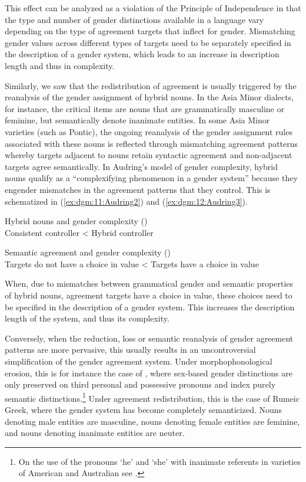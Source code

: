 \documentclass[output=collectionpaper]{langsci/langscibook}
\begin{document}
This effect can be analyzed as a violation of the Principle of Independence in that the type and number of gender distinctions available in a language vary depending on the type of agreement targets that inflect for gender.  Mismatching gender values across different types of targets need to be separately specified in the description of a gender system, which leads to an increase in description length and thus in complexity.

Similarly, we saw that the redistribution of agreement is usually triggered by the reanalysis of the gender assignment of hybrid nouns. In the Asia Minor  dialects, for instance, the critical items are nouns that are grammatically masculine or feminine, but semantically denote inanimate entities. In some Asia Minor  varieties (such as Pontic), the ongoing reanalysis of the gender assignment rules associated with these nouns is reflected through mismatching agreement patterns whereby targets adjacent to nouns retain syntactic agreement and non-adjacent targets agree semantically. In Audring's model of gender complexity, hybrid nouns qualify as a ``complexifying phenomenon in a gender system'' because they engender mismatches in the agreement patterns that they control. This is schematized in (\ref{ex:dgm:11:Audring2}) and (\ref{ex:dgm:12:Audring3}).

\ea\label{ex:dgm:11:Audring2}
Hybrid nouns and gender complexity (\citealt{Audring2017})\\

\vspace{3mm}
Consistent controller {\textless} Hybrid controller
\z

\ea\label{ex:dgm:12:Audring3}
Semantic agreement and gender complexity (\citealt{Audring2017})\\

\vspace{3mm}
Targets do not have a choice in value {\textless} Targets have a choice in value
\z

When, due to mismatches between grammatical gender and semantic properties of hybrid nouns, agreement targets have a choice in value, these choices need to be specified in the description of a gender system. This increases the description length of the system, and thus its complexity.

Conversely, when the reduction, loss or semantic reanalysis of gender agreement patterns are more pervasive, this usually results in an uncontroversial simplification of the gender agreement system. Under morphophonological erosion, this is for instance the case of , where sex-based gender distinctions are only preserved on third personal and possessive pronouns and index purely semantic distinctions.\footnote{On the use of the pronouns `he' and `she' with inanimate referents in varieties of American and Australian  see \citet{Pawley2004}.}  Under agreement redistribution, this is the case of Rumeic Greek, where the gender system has become completely semanticized. Nouns denoting male entities are masculine, nouns denoting female entities are feminine, and nouns denoting inanimate entities are neuter.
\end{document}
